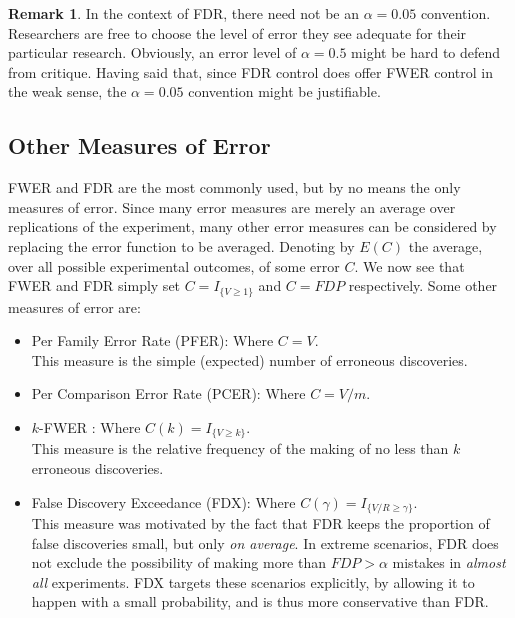 \documentclass[review,12pt]{article}
\theoremstyle{definition}
\theoremstyle{definition}
\newtheorem{remark}{Remark}[section]
\begin{document}
\begin{remark}
In the context of FDR, there need not be an $\alpha=0.05$ convention. Researchers are free to choose the level of error they see adequate for their particular research. Obviously, an error level of $\alpha=0.5$ might be hard to defend from critique. Having said that, since FDR control does offer FWER control in the weak sense, the $\alpha=0.05$ convention might be justifiable.
\end{remark}




\subsection{\label{sec:other_measures}Other Measures of Error}
FWER and FDR are the most commonly used, but by no means the only measures of error. Since many error measures are merely an average over replications of the experiment, many other error measures can be considered by replacing the error function to be averaged. Denoting by $E(C)$ the average, over all possible experimental outcomes, of some error $C$. We now see that FWER and FDR simply set  $C = I_{\{ V \geq 1 \} } $ and $C = FDP$ respectively.
Some other measures of error are:



\begin{itemize}

\item Per Family Error Rate (PFER): Where $C=V$.\\
This measure is the simple (expected) number of erroneous discoveries. 

\item Per Comparison Error Rate (PCER): Where $C=V/m$.

\item $k$-FWER \citep{van_der_laan_augmentation_2004}: Where $C(k) = I_{\{ V \geq k \} }$.\\
This measure is the relative frequency of the making of no less than $k$ erroneous discoveries.

\item False Discovery Exceedance (FDX)\citep{genovese_exceedance_2006}: Where $C(\gamma) = I_{\{ V/R \geq \gamma \} }$.\\
This measure was motivated by the fact that FDR keeps the proportion of false discoveries small, but only \emph{on average}. 
In extreme scenarios, FDR does not exclude the possibility of making more than $FDP>\alpha$ mistakes in \emph{almost all} experiments. FDX targets these scenarios explicitly, by allowing it to happen with a small probability, and is thus more conservative than FDR. 

\end{itemize}
\end{document}
